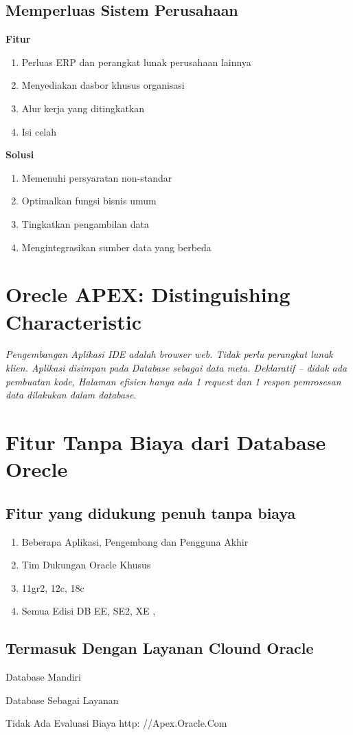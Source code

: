 \documentclass[a4paper,12pt]{report}
\begin{document}
\subsection{Memperluas Sistem Perusahaan}
\textbf{Fitur}
\begin{enumerate}
    \item Perluas ERP dan perangkat lunak perusahaan lainnya
    \item Menyediakan dasbor khusus organisasi
    \item Alur kerja yang ditingkatkan
    \item Isi celah
\end{enumerate}
\textbf{Solusi}
\begin{enumerate}
    \item Memenuhi persyaratan non-standar
    \item Optimalkan fungsi bisnis umum
    \item Tingkatkan pengambilan data
    \item Mengintegrasikan sumber data yang berbeda
\end{enumerate}
\section{Orecle APEX: Distinguishing Characteristic}
\textit {Pengembangan Aplikasi  IDE adalah browser web. Tidak perlu perangkat lunak klien. Aplikasi disimpan pada Database sebagai data meta. Deklaratif – didak ada pembuatan kode, Halaman efisien hanya ada 1 request dan  1 respon pemrosesan data dilakukan dalam database}.
\section{Fitur Tanpa Biaya dari Database Orecle}
\subsection{Fitur yang didukung penuh tanpa biaya}
\begin{enumerate}
    \item Beberapa Aplikasi, Pengembang dan Pengguna Akhir
    \item Tim Dukungan Oracle Khusus
    \item 11gr2, 12c, 18c
    \item Semua Edisi DB EE, SE2, XE , 
\end{enumerate}
\subsection{Termasuk Dengan Layanan Clound Oracle}
\begin{unumerate}
    \item Database Mandiri 
    \item Database Sebagai Layanan
    \item Tidak Ada Evaluasi Biaya http: //Apex.Oracle.Com
\end{unumerate}
\end{document}
